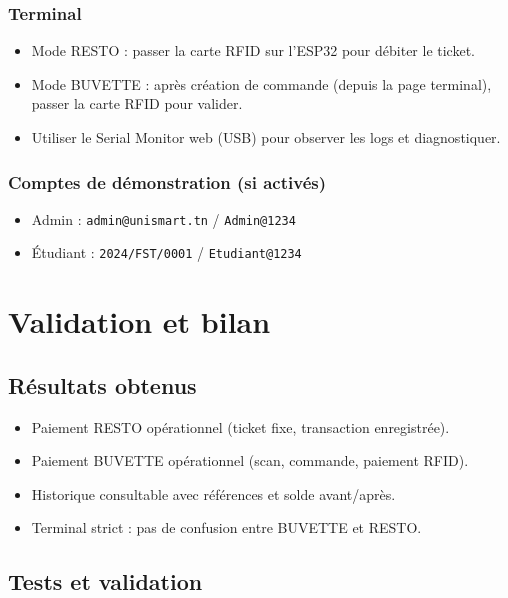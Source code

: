 \documentclass[12pt,a4paper]{report}
\begin{document}
\subsection{Terminal}
\begin{itemize}
  \item Mode RESTO : passer la carte RFID sur l’ESP32 pour débiter le ticket.
  \item Mode BUVETTE : après création de commande (depuis la page terminal), passer la carte RFID pour valider.
  \item Utiliser le Serial Monitor web (USB) pour observer les logs et diagnostiquer.
\end{itemize}

\subsection{Comptes de démonstration (si activés)}
\begin{itemize}
  \item Admin : \texttt{admin@unismart.tn} / \texttt{Admin@1234}
  \item Étudiant : \texttt{2024/FST/0001} / \texttt{Etudiant@1234}
\end{itemize}

\chapter{Validation et bilan}
\section{Résultats obtenus}
\begin{itemize}
  \item Paiement RESTO opérationnel (ticket fixe, transaction enregistrée).
  \item Paiement BUVETTE opérationnel (scan, commande, paiement RFID).
  \item Historique consultable avec références et solde avant/après.
  \item Terminal strict : pas de confusion entre BUVETTE et RESTO.
\end{itemize}

\section{Tests et validation}
\end{document}
